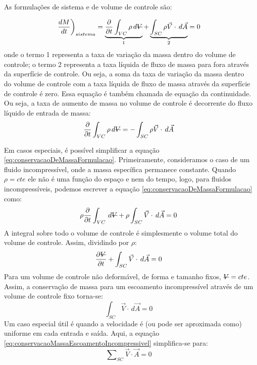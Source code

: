 \documentclass{article}
\newcommand{\stkout}[1]{\ifmmode\text{\sout{\ensuremath{#1}}}\else\sout{#1}\fi}
\begin{document}
As formulações de sistema e de volume de controle são:

\begin{equation}
  \left.\frac{dM}{dt}\right)_{sistema}=\underbrace{\frac{\partial}{\partial t}\int_{VC}^{ } \rho \, d\stkout{V}}_{\text{1}} + \underbrace{\int_{SC}^{ } \rho \vec{V} \cdot \, d\vec{A}}_{2} = 0
  \label{eq:conservacaoDeMassaFormulacao}
\end{equation}
onde o termo 1 representa a taxa de variação da massa dentro do volume de controle; o termo 2 representa a taxa líquida de fluxo de massa para fora através da superfície de controle.
 Ou seja, a soma da taxa de variação da massa dentro do volume de controle com a taxa líquida de fluxo de massa através da superfície de controle é zero. Essa equação é também chamada de equação da continuidade. Ou seja, a taxa de aumento de massa no volume de controle é decorrente do fluxo líquido de entrada de massa:
\begin{align*}
  \frac{\partial}{\partial t}\int_{VC}^{ } \rho \, d\stkout{V} = -\int_{SC}^{ } \rho \vec{V} \cdot \, d\vec{A}
\end{align*}

Em casos especiais, é possível simplificar a equação \ref{eq:conservacaoDeMassaFormulacao}. Primeiramente, consideramos o caso de um fluido incompressível, onde a massa específica permanece constante. Quando $\rho = cte$ ele não é uma função do espaço e nem do tempo, logo, para fluidos incompressíveis, podemos escrever a equação \ref{eq:conservacaoDeMassaFormulacao} como:
\begin{align*}
  \rho \frac{\partial}{\partial t}\int_{VC}^{ } \, d\stkout{V} + \rho \int_{SC}^{ } \vec{V} \cdot \, d\vec{A}=0
\end{align*}
A integral sobre todo o volume de controle é simplesmente o volume total do volume de controle. Assim, dividindo por $\rho$:
\begin{align*}
 \frac{\partial \stkout V}{\partial t} +  \int_{SC}^{ } \vec{V} \cdot \, d\vec{A}=0
\end{align*}
Para um volume de controle não deformável, de forma e tamanho fixos, $\stkout{V} = cte$. Assim, a conservação de massa para um escoamento incompressível através de um volume de controle fixo torna-se:
\begin{equation}
  \int_{SC}^{ } \vec{V}\cdot\, d\vec{A}=0
  \label{eq:conservacaoMassaEscoamentoIncompressivel}
\end{equation}
Um caso especial útil é quando a velocidade é (ou pode ser aproximada como) uniforme em cada entrada e saída. Aqui, a equação \ref{eq:conservacaoMassaEscoamentoIncompressivel} simplifica-se para:
\begin{equation}
  \sum\nolimits_{SC} \vec{V} \cdot \vec{A}=0
  \label{eq:conservacaoMassaEscoamentoIncompressivelVelocidadeUniforme}
\end{equation}
\end{document}
